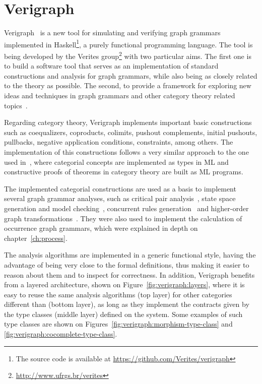 \chapter{Verigraph}\label{ch:verigraph}

Verigraph~\cite{verigraph} is a new tool for simulating and verifying graph grammars implemented in Haskell\footnote{The source code is available at \url{https://github.com/Verites/verigraph}}, a purely functional programming language. The tool is being developed by the Verites group\footnote{\url{http://www.ufrgs.br/verites}} with two particular aims. The first one is to build a software tool that serves as an implementation of standard constructions and analysis for graph grammars, while also being as closely related to the theory as possible. The second, to provide a framework for exploring new ideas and techniques in graph grammars and other category theory related topics~\cite{BezerraETMF2016,Costa2016,CostaETMF2016, Becker2014}.

Regarding category theory, Verigraph implements important basic constructions such as coequalizers, coproducts, colimits, pushout complements, initial pushouts, pullbacks, negative application conditions, constraints, among others. The implementation of this constructions follows a very similar approach to the one used in~\cite{Rydeheard1988}, where categorial concepts are implemented as types in ML and constructive proofs of theorems in category theory are built as ML programs.

The implemented categorial constructions are used as a basis to implement several graph grammar analyses, such as critical pair analysis~\cite{Lambers2006}, state space generation and model checking~\cite{Becker2014}, concurrent rules generation~\cite{BezerraETMF2016} and higher-order graph transformations~\cite{Machado2015}. They were also used to implement the calculation of occurrence graph grammars, which were explained in depth on chapter~\ref{ch:process}.

The analysis algorithms are implemented in a generic functional style, having the advantage of being very close to the formal definitions, thus making it easier to reason about them and to inspect for correctness. In addition, Verigraph benefits from a layered architecture, shown on Figure~\ref{fig:verigraph:layers}, where it is easy to reuse the same analysis algorithms (top layer) for other categories different than  (bottom layer), as long as they implement the contracts given by the type classes (middle layer) defined on the system. Some examples of such type classes are shown on Figures~\ref{fig:verigraph:morphism-type-class} and \ref{fig:verigraph:cocomplete-type-class}.

